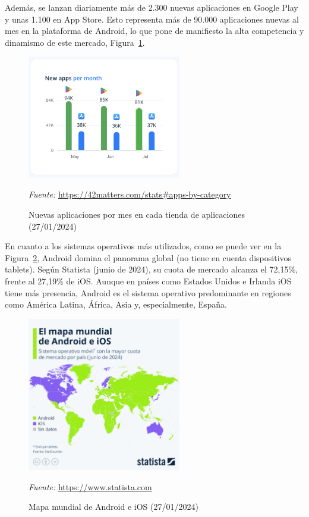 Además, se lanzan diariamente más de 2.300 nuevas aplicaciones en Google Play y unas 1.100 en App Store. Esto representa más de 90.000 aplicaciones nuevas al mes en la plataforma de Android, lo que pone de manifiesto la alta competencia y dinamismo de este mercado, Figura~\ref{fig:apps_per_month}.

\begin{figure}[H]
\centering
\includegraphics[width=0.6\textwidth]{./img/intro/apps_per_month.png}
\caption{Nuevas aplicaciones por mes en cada tienda de aplicaciones (27/01/2024)}
\label{fig:apps_per_month}
\vspace{0.2em}
{\footnotesize \centering \textit{Fuente:} \url{https://42matters.com/stats#apps-by-category} \par}
\end{figure}

En cuanto a los sistemas operativos más utilizados, como se puede ver en la Figura~\ref{fig:world_map_ios_android}, Android domina el panorama global (no tiene en cuenta dispositivos tablets). Según Statista (junio de 2024), su cuota de mercado alcanza el 72,15\%, frente al 27,19\% de iOS. Aunque en países como Estados Unidos e Irlanda iOS tiene más presencia, Android es el sistema operativo predominante en regiones como América Latina, África, Asia y, especialmente, España.

\begin{figure}[H]
\centering
\includegraphics[width=0.6\textwidth]{./img/intro/world_map_ios_android.jpeg}
\caption{Mapa mundial de Android e iOS (27/01/2024)}
\label{fig:world_map_ios_android}
\vspace{0.2em}
{\footnotesize \centering \textit{Fuente:} \url{https://www.statista.com} \par}
\end{figure}

